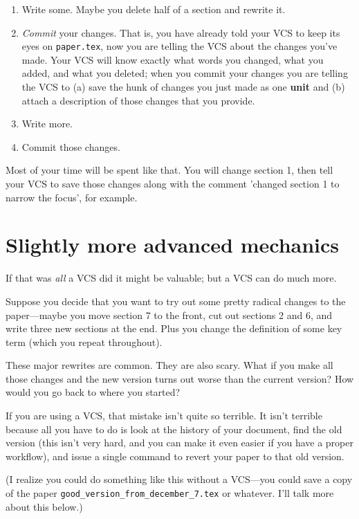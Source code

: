 \documentclass{article}
\begin{document}
\begin{enumerate}
\item
  Write some. Maybe you delete half of a section and rewrite it.
\item
  \emph{Commit} your changes. That is, you have already told your VCS 
  to keep its eyes on \verb!paper.tex!, now you are telling the VCS 
  about the changes you've made. Your VCS will know exactly what words 
  you changed, what you added, and what you deleted; when you commit 
  your changes you are telling the VCS to (a) save the hunk of changes 
  you just made as one \textbf{unit} and (b) attach a description of 
  those changes that you provide.
\item
  Write more.
\item
  Commit those changes.
\end{enumerate}
Most of your time will be spent like that. You will change section 1, 
then tell your VCS to save those changes along with the comment 
'changed section 1 to narrow the focus', for example.

\section{Slightly more advanced mechanics}

If that was \emph{all} a VCS did it might be valuable; but a VCS can 
do much more.

Suppose you decide that you want to try out some pretty radical 
changes to the paper—maybe you move section 7 to the front, cut out 
sections 2 and 6, and write three new sections at the end. Plus you 
change the definition of some key term (which you repeat throughout).

These major rewrites are common. They are also scary. What if you make 
all those changes and the new version turns out worse than the current 
version? How would you go back to where you started?

If you are using a VCS, that mistake isn't quite so terrible. It isn't 
terrible because all you have to do is look at the history of your 
document, find the old version (this isn't very hard, and you can make 
it even easier if you have a proper workflow), and issue a single 
command to revert your paper to that old version.

(I realize you could do something like this without a VCS—you could 
save a copy of the paper \verb!good_version_from_december_7.tex! or 
whatever. I'll talk more about this below.)
\end{document}
